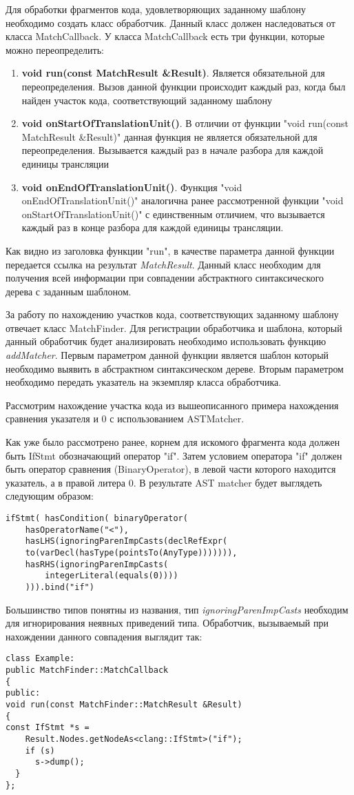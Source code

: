 Для обработки фрагментов кода, удовлетворяющих заданному шаблону необходимо создать класс обработчик.
Данный класс должен наследоваться от класса MatchCallback. У класса MatchCallback есть три функции, 
которые можно переопределить:
\begin{enumerate}
	\item \textbf{void run(const MatchResult \&Result)}. Является обязательной для переопределения.
Вызов данной функции происходит каждый раз, когда был найден участок кода, соответствующий
заданному шаблону
	\item \textbf{void onStartOfTranslationUnit()}. В отличии от функции "void run(const MatchResult \&Result)"
данная функция не является обязательной для переопределения. Вызывается каждый раз в начале
разбора для каждой единицы трансляции
	\item \textbf{void onEndOfTranslationUnit()}. Функция "void onEndOfTranslationUnit()"
аналогична ранее рассмотренной функции "void onStartOfTranslationUnit()" с единственным отличием,
что вызывается каждый раз в конце разбора для каждой единицы трансляции.
\end{enumerate}

Как видно из заголовка функции "run", в качестве параметра данной функции передается ссылка
на результат {\em MatchResult}. Данный класс необходим для получения всей информации при
совпадении абстрактного синтаксического дерева с заданным шаблоном. 

За работу по нахождению участков кода, соответствующих заданному шаблону отвечает класс
MatchFinder. Для регистрации обработчика и шаблона, который данный обработчик будет анализировать
необходимо использовать функцию \textit{addMatcher}. Первым параметром данной функции является 
шаблон который необходимо выявить в абстрактном синтаксическом дереве. Вторым параметром необходимо
передать указатель на экземпляр класса обработчика. 

Рассмотрим нахождение участка кода из вышеописанного примера нахождения сравнения указателя
и 0 с использованием ASTMatcher.

Как уже было рассмотрено ранее, корнем для искомого фрагмента кода должен быть IfStmt обозначающий
оператор "if". Затем условием оператора "if" должен быть оператор сравнения (BinaryOperator), 
в левой части которого находится указатель, а в правой литера 0. В результате AST matcher будет
выглядеть следующим образом: 
\begin{lstlisting}
ifStmt( hasCondition( binaryOperator(
	hasOperatorName("<"),
	hasLHS(ignoringParenImpCasts(declRefExpr(
    to(varDecl(hasType(pointsTo(AnyType))))))),
    hasRHS(ignoringParenImpCasts(
    	integerLiteral(equals(0))))
    ))).bind("if")
\end{lstlisting}
Большинство типов понятны из названия, тип {\em ignoringParenImpCasts} необходим для
игнорирования неявных приведений типа. 
Обработчик, вызываемый при нахождении данного совпадения выглядит так:
\begin{lstlisting}
class Example:
public MatchFinder::MatchCallback 
{
public:
void run(const MatchFinder::MatchResult &Result) 
{
const IfStmt *s = 
	Result.Nodes.getNodeAs<clang::IfStmt>("if");
    if (s)
      s->dump();
  }
};
\end{lstlisting}

